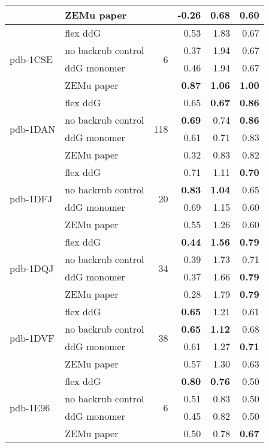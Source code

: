 \begin{longtable}{llrrrr}
 & ZEMu paper & & -0.26 & 0.68 & 0.60  \\
\hline
 \multirow{ 4}{*}{pdb-1CSE} & flex ddG & \multirow{ 4}{*}{6} & 0.53 & 1.83 & 0.67  \\
 & no backrub control & & 0.37 & 1.94 & 0.67  \\
 & ddG monomer & & 0.46 & 1.94 & 0.67  \\
 & ZEMu paper & & \textbf{0.87} & \textbf{1.06} & \textbf{1.00}  \\
\hline
 \multirow{ 4}{*}{pdb-1DAN} & flex ddG & \multirow{ 4}{*}{118} & 0.65 & \textbf{0.67} & \textbf{0.86}  \\
 & no backrub control & & \textbf{0.69} & 0.74 & \textbf{0.86}  \\
 & ddG monomer & & 0.61 & 0.71 & 0.83  \\
 & ZEMu paper & & 0.32 & 0.83 & 0.82  \\
\hline
 \multirow{ 4}{*}{pdb-1DFJ} & flex ddG & \multirow{ 4}{*}{20} & 0.71 & 1.11 & \textbf{0.70}  \\
 & no backrub control & & \textbf{0.83} & \textbf{1.04} & 0.65  \\
 & ddG monomer & & 0.69 & 1.15 & 0.60  \\
 & ZEMu paper & & 0.55 & 1.26 & 0.60  \\
\hline
 \multirow{ 4}{*}{pdb-1DQJ} & flex ddG & \multirow{ 4}{*}{34} & \textbf{0.44} & \textbf{1.56} & \textbf{0.79}  \\
 & no backrub control & & 0.39 & 1.73 & 0.71  \\
 & ddG monomer & & 0.37 & 1.66 & \textbf{0.79}  \\
 & ZEMu paper & & 0.28 & 1.79 & \textbf{0.79}  \\
\hline
 \multirow{ 4}{*}{pdb-1DVF} & flex ddG & \multirow{ 4}{*}{38} & \textbf{0.65} & 1.21 & 0.61  \\
 & no backrub control & & \textbf{0.65} & \textbf{1.12} & 0.68  \\
 & ddG monomer & & 0.61 & 1.27 & \textbf{0.71}  \\
 & ZEMu paper & & 0.57 & 1.30 & 0.63  \\
\hline
 \multirow{ 4}{*}{pdb-1E96} & flex ddG & \multirow{ 4}{*}{6} & \textbf{0.80} & \textbf{0.76} & 0.50  \\
 & no backrub control & & 0.51 & 0.83 & 0.50  \\
 & ddG monomer & & 0.45 & 0.82 & 0.50  \\
 & ZEMu paper & & 0.50 & 0.78 & \textbf{0.67}  \\
\hline

\end{longtable}

